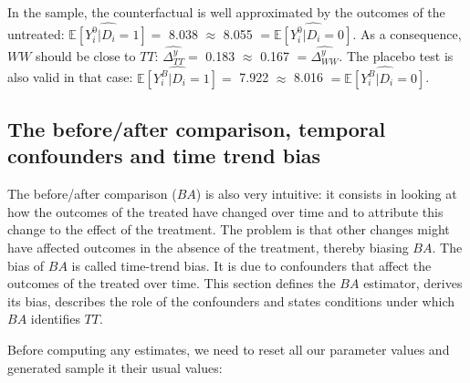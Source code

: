 \documentclass[]{book}
\newcommand{\esp}[1]{\mathbb{E}[ #1 ]}
\theoremstyle{definition}
\theoremstyle{definition}
\theoremstyle{definition}
\theoremstyle{remark}
\let\BeginKnitrBlock\begin \let\EndKnitrBlock\end
\begin{document}
In the sample, the counterfactual is well approximated by the outcomes of the untreated: \(\hat{\esp{Y_i^0|D_i=1}}=\) 8.038 \(\approx\) 8.055 \(=\hat{\esp{Y_i^0|D_i=0}}\).
As a consequence, \(WW\) should be close to \(TT\): \(\hat{\Delta^y_{TT}}=\) 0.183 \(\approx\) 0.167 \(=\hat{\Delta^y_{WW}}\).
The placebo test is also valid in that case: \(\hat{\esp{Y_i^B|D_i=1}}=\) 7.922 \(\approx\) 8.016 \(=\hat{\esp{Y_i^B|D_i=0}}\).

\hypertarget{the-beforeafter-comparison-temporal-confounders-and-time-trend-bias}{%
\subsection{The before/after comparison, temporal confounders and time trend bias}\label{the-beforeafter-comparison-temporal-confounders-and-time-trend-bias}}

The before/after comparison (\(BA\)) is also very intuitive: it consists in looking at how the outcomes of the treated have changed over time and to attribute this change to the effect of the treatment.
The problem is that other changes might have affected outcomes in the absence of the treatment, thereby biasing \(BA\).
The bias of \(BA\) is called time-trend bias.
It is due to confounders that affect the outcomes of the treated over time.
This section defines the \(BA\) estimator, derives its bias, describes the role of the confounders and states conditions under which \(BA\) identifies \(TT\).

\BeginKnitrBlock{example}
\protect\hypertarget{exm:unnamed-chunk-23}{}{\label{exm:unnamed-chunk-23} }Before computing any estimates, we need to reset all our parameter values and generated sample it their usual values:
\EndKnitrBlock{example}
\end{document}
